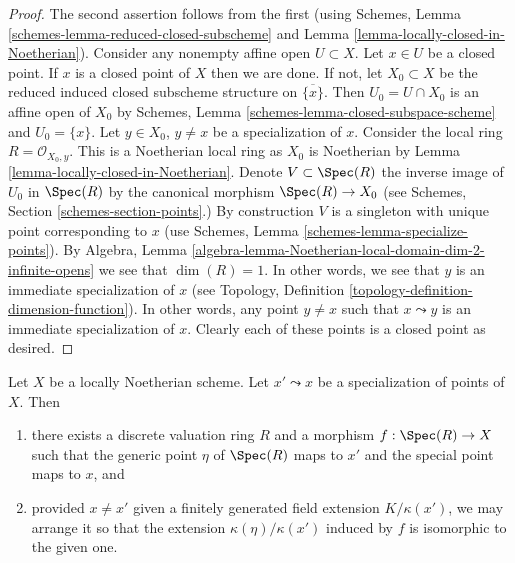 \begin{proof}
The second assertion follows from the first (using
Schemes, Lemma \ref{schemes-lemma-reduced-closed-subscheme}
and Lemma \ref{lemma-locally-closed-in-Noetherian}).
Consider any nonempty affine open $U \subset X$.
Let $x \in U$ be a closed point. If $x$ is a closed point
of $X$ then we are done. If not, let $X_0 \subset X$ be the
reduced induced closed subscheme structure on $\overline{\{x\}}$.
Then $U_0 = U \cap X_0$ is an affine open of $X_0$ by
Schemes, Lemma \ref{schemes-lemma-closed-subspace-scheme} and
$U_0 = \{x\}$. Let $y \in X_0$, $y \not = x$ be a specialization of $x$.
Consider the local ring $R = \mathcal{O}_{X_0, y}$.
This is a Noetherian local ring as $X_0$ is Noetherian
by Lemma \ref{lemma-locally-closed-in-Noetherian}. Denote $V \subset \Spec(R)$
the inverse image of $U_0$ in $\Spec(R)$ by the canonical morphism
$\Spec(R) \to X_0$ (see Schemes, Section \ref{schemes-section-points}.)
By construction $V$ is a singleton with unique point corresponding to $x$ (use
Schemes, Lemma \ref{schemes-lemma-specialize-points}).
By
Algebra, Lemma \ref{algebra-lemma-Noetherian-local-domain-dim-2-infinite-opens}
we see that $\dim(R) = 1$.
In other words, we see that $y$ is an immediate specialization
of $x$ (see Topology, Definition \ref{topology-definition-dimension-function}).
In other words, any
point $y \not = x$ such that $x \leadsto y$ is an immediate
specialization of $x$. Clearly each of these points is a
closed point as desired.
\end{proof}

\begin{lemma}
\label{lemma-locally-Noetherian-specialization-dvr}
Let $X$ be a locally Noetherian scheme.
Let $x' \leadsto x$ be a specialization of points of $X$. Then
\begin{enumerate}
\item there exists a discrete valuation ring $R$ and a morphism
$f : \Spec(R) \to X$ such that the generic point $\eta$ of
$\Spec(R)$ maps to $x'$ and the special point maps to $x$, and
\item provided $x \not = x'$ given a finitely generated field
extension $K/\kappa(x')$, we may arrange it so that the extension
$\kappa(\eta)/\kappa(x')$
induced by $f$ is isomorphic to the given one.
\end{enumerate}
\end{lemma}

